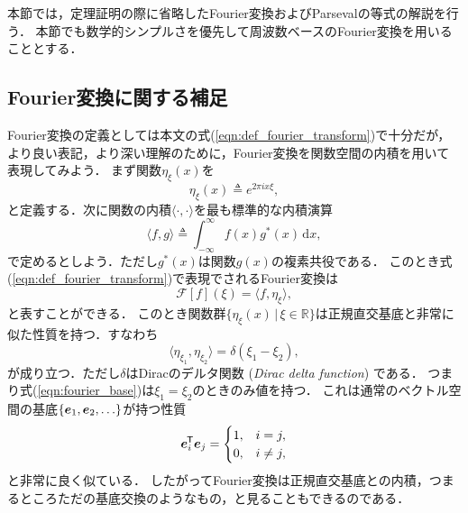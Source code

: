 %

本節では，定理証明の際に省略したFourier変換およびParsevalの等式の解説を行う．
本節でも数学的シンプルさを優先して周波数ベースのFourier変換を用いることとする．

\subsection*{Fourier変換に関する補足}

Fourier変換の定義としては本文の式(\ref{eqn:def_fourier_transform})で十分だが，
より良い表記，より深い理解のために，Fourier変換を関数空間の内積を用いて表現してみよう．
まず関数$\eta_{\xi}(x)$を
\begin{equation}
    \eta_{\xi}(x) \triangleq e^{2\pi i x \xi},
\end{equation}
と定義する．次に関数の内積$\langle \cdot, \cdot \rangle$を最も標準的な内積演算
\begin{equation}
    \langle f, g \rangle \triangleq \int_{-\infty}^{\infty} f(x) g^*(x) \, \mathrm{d}x,
\end{equation}
で定めるとしよう．ただし$g^*(x)$は関数$g(x)$の複素共役である．
このとき式(\ref{eqn:def_fourier_transform})で表現でされるFourier変換は
\begin{equation}
    \mathcal{F}[f](\xi) = \langle f, \eta_{\xi} \rangle,
\end{equation}
と表すことができる．
このとき関数群$\{ \eta_{\xi}(x) \,|\, \xi \in \mathbb{R} \}$は正規直交基底と非常に似た性質を持つ．すなわち
\begin{equation}
    \langle \eta_{\xi_1}, \eta_{\xi_2} \rangle = \delta(\xi_1 - \xi_2),
    \label{eqn:fourier_base}
\end{equation}
が成り立つ．ただし$\delta$はDiracのデルタ関数 (\textit{Dirac delta function}) である．
つまり式(\ref{eqn:fourier_base})は$\xi_1 = \xi_2$のときのみ値を持つ．
これは通常のベクトル空間の基底$\{ \boldsymbol{e}_1, \boldsymbol{e}_2, \ldots \}$が持つ性質
\begin{equation}
    \boldsymbol{e}_i^{\mkern-1.5mu\mathsf{T}} \boldsymbol{e}_j =
    \begin{cases}
        1, & i = j, \\
        0, & i \neq j,
    \end{cases}
\end{equation}
と非常に良く似ている．
したがってFourier変換は正規直交基底との内積，つまるところただの基底交換のようなもの，と見ることもできるのである．

